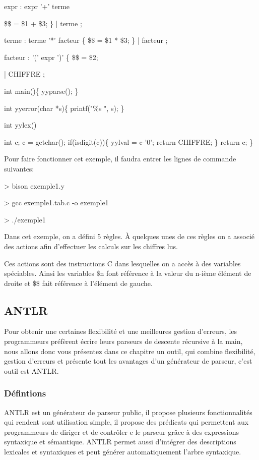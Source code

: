 \documentclass{article}
\begin{document}
expr : expr '+' terme \\{ \$\$ = \$1 + \$3; \}
    | terme
    ;
   
terme : terme '*' facteur \{ \$\$ = \$1 * \$3; \}
    | facteur
    ;
   
facteur : '(' expr ')' \{ \$\$ = \$2; \\}
    | CHIFFRE
    ;

int main()\{
    yyparse();   
\}

int yyerror(char *s)\{
    printf("\%s \n", s);
\}


int yylex()\\{
    int c;
    c = getchar();
    if(isdigit(c))\{
        yylval = c-'0';
        return CHIFFRE;
    \}
    return c;
\}

Pour faire fonctionner cet exemple, il faudra entrer les lignes de commande suivantes:

> bison exemple1.y

> gcc exemple1.tab.c -o exemple1

> ./exemple1

Dans cet exemple, on a défini 5 règles. À quelques unes de ces règles on a associé des actions afin d’effectuer les calculs sur les chiffres lus.

Ces actions sont des instructions C dans lesquelles on a accès à des variables spéciables.
Ainsi les variables \$n font référence à la valeur du n-ième élément de droite et \$\$ fait référence à l’élément de gauche.

\subsection{ANTLR}
Pour obtenir une certaines flexibilité et une meilleures gestion d’erreurs, les programmeurs préfèrent écrire leurs parseurs de descente récursive à la main, nous allons donc vous présentez dans ce chapitre un outil, qui combine flexibilité, gestion d’erreurs  et présente tout les avantages d’un générateur de parseur, c’est outil est ANTLR.
\subsubsection{Défintions}
ANTLR est un générateur de parseur public, il propose plusieurs fonctionnalités qui rendent sont utilisation simple, il propose  des prédicats qui permettent aux programmeurs de diriger et de contrôler e le parseur grâce à des expressions syntaxique et sémantique.
ANTLR permet aussi d’intégrer des  descriptions lexicales et syntaxiques  et peut générer automatiquement l’arbre syntaxique.
}
\end{document}
